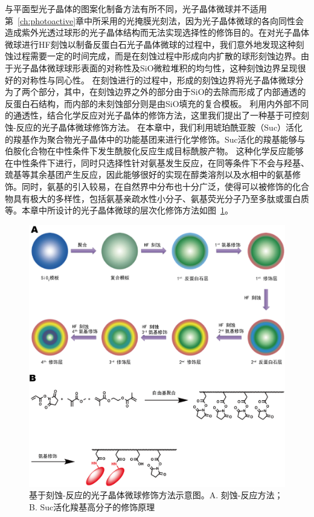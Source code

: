 与平面型光子晶体的图案化制备方法有所不同，光子晶体微球并不适用第~\ref{ch:photoactive}章中所采用的光掩膜光刻法，因为光子晶体微球的各向同性会造成紫外光透过球形的光子晶体结构而无法实现选择性的修饰目的。在对光子晶体微球进行HF刻蚀以制备反蛋白石光子晶体微球的过程中，我们意外地发现这种刻蚀过程需要一定的时间完成，而是在刻蚀过程中形成向内扩散的球形刻蚀边界。由于光子晶体微球球形表面的对称性及SiO微粒堆积的均匀性，这种刻蚀边界呈现很好的对称性与同心性。
在刻蚀进行的过程中，形成的刻蚀边界将光子晶体微球分为了两个部分，其中，在刻蚀边界之外的部分由于SiO的去除而形成了内部通透的反蛋白石结构，而内部的未刻蚀部分则是由SiO填充的复合模板。
利用内外部不同的通透性，结合化学反应对光子晶体的修饰方法，这里我们提出了一种基于可控刻蚀-反应的光子晶体微球修饰方法。
在本章中，我们利用琥珀酰亚胺（Suc）活化的羧基作为聚合物光子晶体中的功能基团来进行化学修饰。Suc活化的羧基能够与伯胺化合物在中性条件下发生酰胺化反应生成目标酰胺产物。
这种化学反应能够在中性条件下进行，同时只选择性针对氨基发生反应，在同等条件下不会与羟基、巯基等其余基团产生反应，因此能够很好的实现在醇类溶剂以及水相中的氨基修饰\cite{Pollak1980Enzyme}。同时，氨基的引入较易，在自然界中分布也十分广泛，使得可以被修饰的化合物具有极大的多样性，包括氨基亲疏水性小分子、氨基荧光分子乃至多肽或蛋白质等。本章中所设计的光子晶体微球的层次化修饰方法如图~\ref{fig:ch5-principle}。
\begin{figure}[htbp]
  \centering
  \includegraphics[width=\linewidth]{figures/ch5/ch5-principle.png}
  \caption{基于刻蚀-反应的光子晶体微球修饰方法示意图。A. 刻蚀-反应方法；B. Suc活化羧基高分子的修饰原理}
  \label{fig:ch5-principle}
\end{figure}

